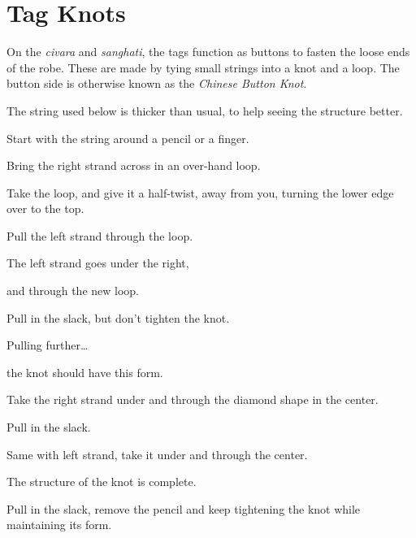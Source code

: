 \chapter{Tag Knots}

On the \emph{civara} and \emph{sanghati}, the tags function as buttons
to fasten the loose ends of the robe. These are made by tying small
strings into a knot and a loop. The button side is otherwise known as
the \emph{Chinese Button Knot}.

The string used below is thicker than usual, to help seeing the
structure better.

Start with the string around a pencil or a finger.


Bring the right strand across in an over-hand loop.


Take the loop, and give it a half-twist, away from you, turning the
lower edge over to the top.


Pull the left strand through the loop.


The left strand goes under the right,


and through the new loop.


Pull in the slack, but don't tighten the knot.


Pulling further\ldots{}


the knot should have this form.


Take the right strand under and through the diamond shape in the center.


Pull in the slack.


Same with left strand, take it under and through the center.


The structure of the knot is complete.

Pull in the slack, remove the pencil and keep tightening the knot while
maintaining its form.






